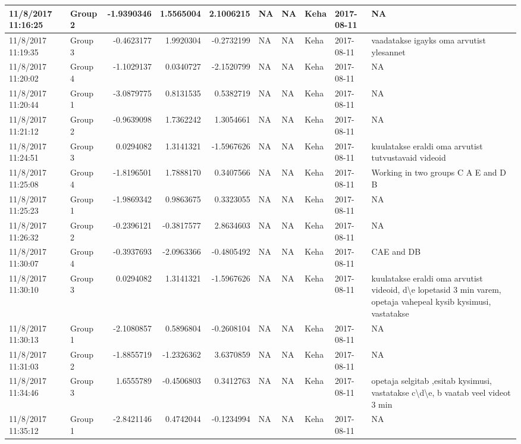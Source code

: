 \documentclass[]{article}
\begin{document}
\begin{tabular}{l|l|r|r|r|l|l|l|l|l}
\hline
11/8/2017 11:16:25 & Group 2 & -1.9390346 & 1.5565004 & 2.1006215 & NA & NA & Keha & 2017-08-11 & NA\\
\hline
11/8/2017 11:19:35 & Group 3 & -0.4623177 & 1.9920304 & -0.2732199 & NA & NA & Keha & 2017-08-11 & vaadatakse igayks oma arvutist ylesannet\\
\hline
11/8/2017 11:20:02 & Group 4 & -1.1029137 & 0.0340727 & -2.1520799 & NA & NA & Keha & 2017-08-11 & NA\\
\hline
11/8/2017 11:20:44 & Group 1 & -3.0879775 & 0.8131535 & 0.5382719 & NA & NA & Keha & 2017-08-11 & NA\\
\hline
11/8/2017 11:21:12 & Group 2 & -0.9639098 & 1.7362242 & 1.3054661 & NA & NA & Keha & 2017-08-11 & NA\\
\hline
11/8/2017 11:24:51 & Group 3 & 0.0294082 & 1.3141321 & -1.5967626 & NA & NA & Keha & 2017-08-11 & kuulatakse eraldi oma arvutist tutvustavaid videoid\\
\hline
11/8/2017 11:25:08 & Group 4 & -1.8196501 & 1.7888170 & 0.3407566 & NA & NA & Keha & 2017-08-11 & Working in two groups C A E and D B\\
\hline
11/8/2017 11:25:23 & Group 1 & -1.9869342 & 0.9863675 & 0.3323055 & NA & NA & Keha & 2017-08-11 & NA\\
\hline
11/8/2017 11:26:32 & Group 2 & -0.2396121 & -0.3817577 & 2.8634603 & NA & NA & Keha & 2017-08-11 & NA\\
\hline
11/8/2017 11:30:07 & Group 4 & -0.3937693 & -2.0963366 & -0.4805492 & NA & NA & Keha & 2017-08-11 & CAE and DB\\
\hline
11/8/2017 11:30:10 & Group 3 & 0.0294082 & 1.3141321 & -1.5967626 & NA & NA & Keha & 2017-08-11 & kuulatakse eraldi oma arvutist videoid, d\textbackslash{}e lopetasid 3 min varem, opetaja vahepeal kysib kysimusi, vastatakse\\
\hline
11/8/2017 11:30:13 & Group 1 & -2.1080857 & 0.5896804 & -0.2608104 & NA & NA & Keha & 2017-08-11 & NA\\
\hline
11/8/2017 11:31:03 & Group 2 & -1.8855719 & -1.2326362 & 3.6370859 & NA & NA & Keha & 2017-08-11 & NA\\
\hline
11/8/2017 11:34:46 & Group 3 & 1.6555789 & -0.4506803 & 0.3412763 & NA & NA & Keha & 2017-08-11 & opetaja selgitab ,esitab kysimusi, vastatakse c\textbackslash{}d\textbackslash{}e, b vaatab veel videot 3 min\\
\hline
11/8/2017 11:35:12 & Group 1 & -2.8421146 & 0.4742044 & -0.1234994 & NA & NA & Keha & 2017-08-11 & NA\\

\end{tabular}
\end{document}
